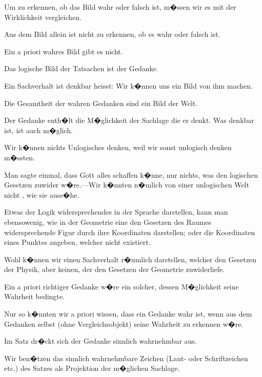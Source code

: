 \begin{propositions}
{Um zu erkennen, ob das Bild wahr oder falsch
ist, m�ssen wir es mit der Wirklichkeit vergleichen.}


{Aus dem Bild allein ist nicht zu erkennen, ob
es wahr oder falsch ist.}


{Ein a priori wahres Bild gibt es nicht.}


{Das logische Bild der Tatsachen ist der
Gedanke.}


{\glqq{}Ein Sachverhalt ist denkbar\grqq{} heisst: Wir
k�nnen uns ein Bild von ihm machen.}


{Die Gesamtheit der wahren Gedanken sind
ein Bild der Welt.}


{Der Gedanke enth�lt die M�glichkeit der
Sachlage die er denkt. Was denkbar ist, ist
auch m�glich.}


{Wir k�nnen nichts Unlogisches denken, weil
wir sonst unlogisch denken m�ssten.}


{Man sagte einmal, dass Gott alles schaffen
k�nne, nur nichts, was den logischen Gesetzen
zuwider w�re.---Wir k�nnten n�mlich von einer
\glqq{}unlogischen\grqq{} Welt nicht , wie sie auss�he.}


{Etwas \glqq{}der Logik widersprechendes\grqq{} in der
Sprache darstellen, kann man ebensowenig, wie
in der Geometrie eine den Gesetzen des Raumes
widersprechende Figur durch ihre Koordinaten
darstellen; oder die Koordinaten eines Punktes
angeben, welcher nicht existiert.}


{Wohl k�nnen wir einen Sachverhalt r�umlich
darstellen, welcher den Gesetzen der Physik,
aber keinen, der den Gesetzen der Geometrie
zuwiderliefe.}


{Ein a priori richtiger Gedanke w�re ein solcher,
dessen M�glichkeit seine Wahrheit bedingte.}


{Nur so k�nnten wir a priori wissen, dass ein
Gedanke wahr ist, wenn aus dem Gedanken
selbst (ohne Vergleichsobjekt) seine Wahrheit
zu erkennen w�re.}


{Im Satz dr�ckt sich der Gedanke sinnlich
wahrnehmbar aus.}


{{\stretchyspace
Wir ben�tzen das sinnlich wahrnehmbare
Zeichen (Laut- oder Schriftzeichen etc.) des Satzes
als Projektion der m�glichen Sachlage.}

}
\end{propositions}
